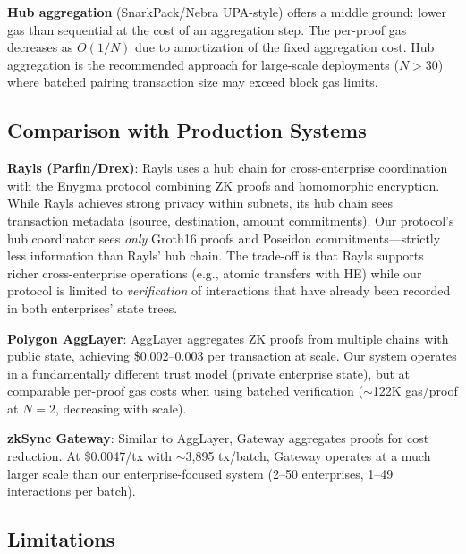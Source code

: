 \textbf{Hub aggregation} (SnarkPack/Nebra UPA-style) offers a middle ground:
lower gas than sequential at the cost of an aggregation step. The per-proof
gas decreases as $O(1/N)$ due to amortization of the fixed aggregation
cost. Hub aggregation is the recommended approach for large-scale
deployments ($N > 30$) where batched pairing transaction size may exceed
block gas limits.

\subsection{Comparison with Production Systems}

\textbf{Rayls (Parfin/Drex)}: Rayls uses a hub chain for cross-enterprise
coordination with the Enygma protocol combining ZK proofs and homomorphic
encryption. While Rayls achieves strong privacy within subnets, its hub
chain sees transaction metadata (source, destination, amount commitments).
Our protocol's hub coordinator sees \emph{only} Groth16 proofs and
Poseidon commitments---strictly less information than Rayls' hub chain.
The trade-off is that Rayls supports richer cross-enterprise operations
(e.g., atomic transfers with HE) while our protocol is limited to
\emph{verification} of interactions that have already been recorded in both
enterprises' state trees.

\textbf{Polygon AggLayer}: AggLayer aggregates ZK proofs from multiple
chains with public state, achieving \$0.002--0.003 per transaction at scale.
Our system operates in a fundamentally different trust model (private
enterprise state), but at comparable per-proof gas costs when using batched
verification ($\sim$122K gas/proof at $N=2$, decreasing with scale).

\textbf{zkSync Gateway}: Similar to AggLayer, Gateway aggregates proofs
for cost reduction. At \$0.0047/tx with $\sim$3,895 tx/batch, Gateway
operates at a much larger scale than our enterprise-focused system (2--50
enterprises, 1--49 interactions per batch).

\subsection{Limitations}

